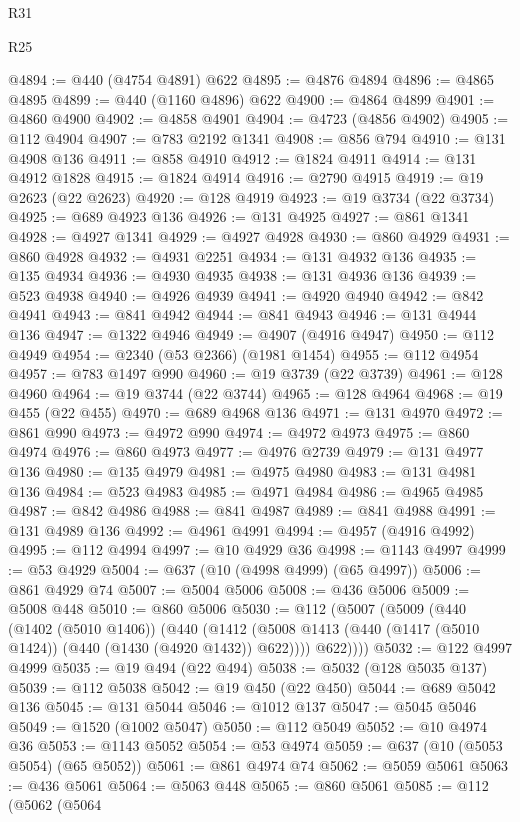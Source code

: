 \begin{lexlean}{R31}
\begin{lexlean}{R25}
\begin{coremodule}
{{{{{{{{{{{{{{{{{{{{{{{{{{{{{{{{{{{{{{{{{{{{{{{{{{{{{{{{{{{{{{{{{{{{{{{{{{{{{{{{{{{{{{{{{{{{{{{{{{{{{{{{{{{{{{{{{{{{{{{{{{{{{{{{{{{{{{{{{{{{{{{{{{{{{{{{{{{{{{{{{{{{{{{{{{{{{{{{{{{{{{{{{{{{{{{{{{{{{{{@4894 := @440 (@4754 @4891) @622
@4895 := @4876 @4894
@4896 := @4865 @4895
@4899 := @440 (@1160 @4896) @622
@4900 := @4864 @4899
@4901 := @4860 @4900
@4902 := @4858 @4901
@4904 := @4723 (@4856 @4902)
@4905 := @112 @4904
@4907 := @783 @2192 @1341
@4908 := @856 @794
@4910 := @131 @4908 @136
@4911 := @858 @4910
@4912 := @1824 @4911
@4914 := @131 @4912 @1828
@4915 := @1824 @4914
@4916 := @2790 @4915
@4919 := @19 @2623 (@22 @2623)
@4920 := @128 @4919
@4923 := @19 @3734 (@22 @3734)
@4925 := @689 @4923 @136
@4926 := @131 @4925
@4927 := @861 @1341
@4928 := @4927 @1341
@4929 := @4927 @4928
@4930 := @860 @4929
@4931 := @860 @4928
@4932 := @4931 @2251
@4934 := @131 @4932 @136
@4935 := @135 @4934
@4936 := @4930 @4935
@4938 := @131 @4936 @136
@4939 := @523 @4938
@4940 := @4926 @4939
@4941 := @4920 @4940
@4942 := @842 @4941
@4943 := @841 @4942
@4944 := @841 @4943
@4946 := @131 @4944 @136
@4947 := @1322 @4946
@4949 := @4907 (@4916 @4947)
@4950 := @112 @4949
@4954 := @2340 (@53 @2366) (@1981 @1454)
@4955 := @112 @4954
@4957 := @783 @1497 @990
@4960 := @19 @3739 (@22 @3739)
@4961 := @128 @4960
@4964 := @19 @3744 (@22 @3744)
@4965 := @128 @4964
@4968 := @19 @455 (@22 @455)
@4970 := @689 @4968 @136
@4971 := @131 @4970
@4972 := @861 @990
@4973 := @4972 @990
@4974 := @4972 @4973
@4975 := @860 @4974
@4976 := @860 @4973
@4977 := @4976 @2739
@4979 := @131 @4977 @136
@4980 := @135 @4979
@4981 := @4975 @4980
@4983 := @131 @4981 @136
@4984 := @523 @4983
@4985 := @4971 @4984
@4986 := @4965 @4985
@4987 := @842 @4986
@4988 := @841 @4987
@4989 := @841 @4988
@4991 := @131 @4989 @136
@4992 := @4961 @4991
@4994 := @4957 (@4916 @4992)
@4995 := @112 @4994
@4997 := @10 @4929 @36
@4998 := @1143 @4997
@4999 := @53 @4929
@5004 := @637 (@10 (@4998 @4999) (@65 @4997))
@5006 := @861 @4929 @74
@5007 := @5004 @5006
@5008 := @436 @5006
@5009 := @5008 @448
@5010 := @860 @5006
@5030 := @112
    (@5007
      (@5009
        (@440
          (@1402 (@5010 @1406))
          (@440
            (@1412 (@5008 @1413 (@440 (@1417 (@5010 @1424)) (@440 (@1430 (@4920 @1432)) @622))))
            @622))))
@5032 := @122 @4997 @4999
@5035 := @19 @494 (@22 @494)
@5038 := @5032 (@128 @5035 @137)
@5039 := @112 @5038
@5042 := @19 @450 (@22 @450)
@5044 := @689 @5042 @136
@5045 := @131 @5044
@5046 := @1012 @137
@5047 := @5045 @5046
@5049 := @1520 (@1002 @5047)
@5050 := @112 @5049
@5052 := @10 @4974 @36
@5053 := @1143 @5052
@5054 := @53 @4974
@5059 := @637 (@10 (@5053 @5054) (@65 @5052))
@5061 := @861 @4974 @74
@5062 := @5059 @5061
@5063 := @436 @5061
@5064 := @5063 @448
@5065 := @860 @5061
@5085 := @112
    (@5062
      (@5064
}}}}}}}}}}}}}}}}}}}}}}}}}}}}}}}}}}}}}}}}}}}}}}}}}}}}}}}}}}}}}}}}}}}}}}}}}}}}}}}}}}}}}}}}}}}}}}}}}}}}}}}}}}}}}}}}}}}}}}}}}}}}}}}}}}}}}}}}}}}}}}}}}}}}}}}}}}}}}}}}}}}}}}}}}}}}}}}}}}}}}}}}}}}}}}}}}}}}}}}
\end{coremodule}
\end{lexlean}
\end{lexlean}
